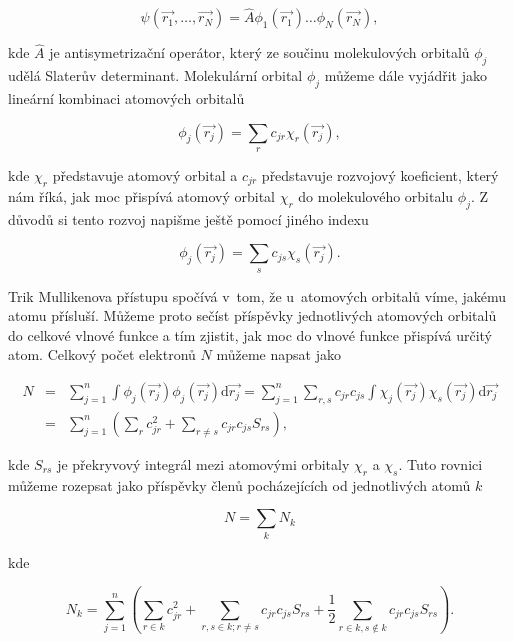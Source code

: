 \begin{equation}
\psi(\vec{r_1}, \dots, \vec{r_N}) = \hat{A} \phi_1 (\vec{r_1}) \dots \phi_N (\vec{r_N}),
\label{rov:Vl-7}
\end{equation}

\noindent kde $\hat{A}$ je antisymetrizační operátor, který ze součinu molekulových orbitalů $\phi_j$ udělá Slaterův determinant. Molekulární orbital $\phi_j$ můžeme dále vyjádřit jako lineární kombinaci atomových orbitalů

\begin{equation}
\phi_j (\vec{r_j}) = \sum_r c_{jr} \chi_r (\vec{r_j}),
\label{rov:Vl-8}
\end{equation}

\noindent kde $\chi_r$ představuje atomový orbital a $c_{jr}$ představuje rozvojový koeficient, který nám říká, jak moc přispívá atomový orbital $\chi_r$ do molekulového orbitalu $\phi_j$. Z~ důvodů si tento rozvoj napišme ještě pomocí jiného indexu

\begin{equation}
\phi_j (\vec{r_j}) = \sum_s c_{js} \chi_s (\vec{r_j}).
\label{rov:Vl-9}
\end{equation}

Trik Mullikenova přístupu spočívá v~tom, že u~atomových orbitalů víme, jakému atomu přísluší. Můžeme proto sečíst příspěvky jednotlivých atomových orbitalů do celkové vlnové funkce a tím zjistit, jak moc do vlnové funkce přispívá určitý atom. Celkový počet elektronů $N$ můžeme napsat jako

\begin{eqnarray}
N &=& \sum_{j=1}^{n} \int \phi_j (\vec{r_j}) \phi_j (\vec{r_j}) \mathrm{d} \vec{r_j} = \sum_{j=1}^{n} \sum_{r,s} c_{jr} c_{js} \int \chi_j (\vec{r_j}) \chi_s (\vec{r_j}) \mathrm{d} \vec{r_j} \nonumber \\
&=& \sum_{j=1}^{n} \left( \sum_r c_{jr}^2 + \sum_{r \not = s} c_{jr} c_{js} S_{rs} \right),
\label{rov:Vl-10}
\end{eqnarray}

\noindent kde $S_{rs}$ je překryvový integrál mezi atomovými orbitaly $\chi_r$ a $\chi_s$. Tuto rovnici můžeme rozepsat jako příspěvky členů pocházejících od jednotlivých atomů $k$

\begin{equation}
N = \sum_k N_k
\label{rov:Vl-11}
\end{equation}

\noindent kde

\begin{equation}
N_k = \sum_{j=1}^{n} \left( \sum_{r \in k} c_{jr}^2 + \sum_{r,s \in k; r \not = s} c_{jr} c_{js} S_{rs} + \frac{1}{2} \sum_{r \in k, s \not \in k} c_{jr} c_{js} S_{rs} \right).
\label{rov:Vl-12}
\end{equation}

